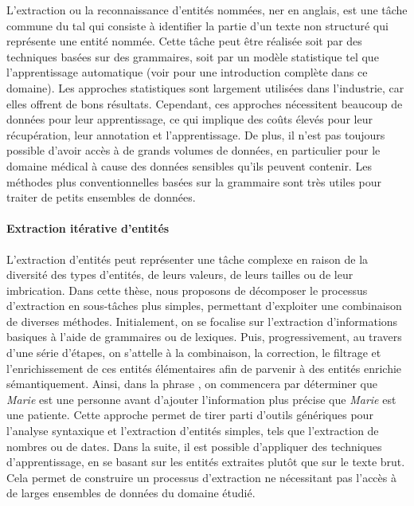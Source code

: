 L'extraction ou la reconnaissance d'entités nommées, \gls{ner} en anglais, est une tâche commune du \gls{tal} qui consiste à identifier la partie d'un texte non structuré qui représente une entité nommée.
Cette tâche peut être réalisée soit par des techniques basées sur des grammaires, soit par un modèle statistique tel que l'apprentissage automatique (voir \cite{jurafskySpeechLanguageProcessing2009} pour une introduction complète dans ce domaine).
Les approches statistiques sont largement utilisées dans l'industrie, car elles offrent de bons résultats.
Cependant, ces approches nécessitent beaucoup de données pour leur apprentissage, ce qui implique des coûts élevés pour leur récupération, leur annotation et l'apprentissage.
De plus, il n'est pas toujours possible d'avoir accès à de grands volumes de données, en particulier pour le domaine médical à cause des données sensibles qu'ils peuvent contenir.
Les méthodes plus conventionnelles basées sur la grammaire sont très utiles pour traiter de petits ensembles de données.

\paragraph{Extraction itérative d'entités}
L'extraction d'entités peut représenter une tâche complexe en raison de la diversité des types d'entités, de leurs valeurs, de leurs tailles ou de leur imbrication.
Dans cette thèse, nous proposons de décomposer le processus d'extraction en sous-tâches plus simples, permettant d'exploiter une combinaison de diverses méthodes.
Initialement, on se focalise sur l'extraction d'informations basiques à l'aide de grammaires ou de lexiques.
Puis, progressivement, au travers d'une série d'étapes, on s'attelle à la combinaison, la correction, le filtrage et l'enrichissement de ces entités élémentaires afin de parvenir à des entités enrichie sémantiquement.
Ainsi, dans la phrase , on commencera par déterminer que \emph{Marie} est une personne avant d'ajouter l'information plus précise que \emph{Marie} est une patiente.
Cette approche permet de tirer parti d'outils génériques pour l'analyse syntaxique et l'extraction d'entités simples, tels que l'extraction de nombres ou de dates.
Dans la suite, il est possible d'appliquer des techniques d'apprentissage, en se basant sur les entités extraites plutôt que sur le texte brut.
Cela permet de construire un processus d'extraction ne nécessitant pas l'accès à de larges ensembles de données du domaine étudié.

